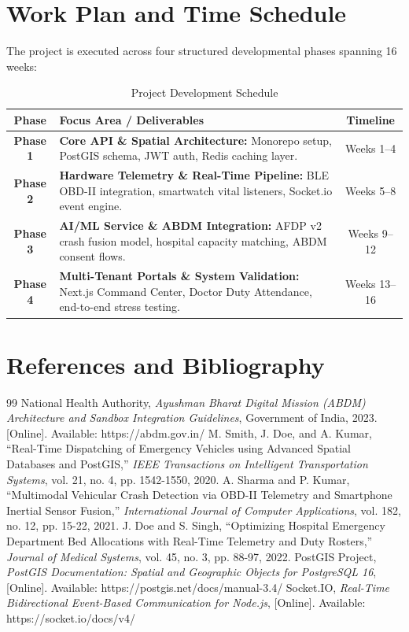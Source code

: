 \documentclass[12pt,a4paper]{article}
\begin{document}
\clearpage
\section{Work Plan and Time Schedule}
The project is executed across four structured developmental phases spanning 16 weeks:

\begin{table}[H]
\centering
\renewcommand{\arraystretch}{1.4}
\begin{tabularx}{\textwidth}{|c|X|c|}
\hline
\textbf{Phase} & \textbf{Focus Area / Deliverables} & \textbf{Timeline} \\ \hline
\textbf{Phase 1} & \textbf{Core API \& Spatial Architecture:} Monorepo setup, PostGIS schema, JWT auth, Redis caching layer. & Weeks 1--4 \\ \hline
\textbf{Phase 2} & \textbf{Hardware Telemetry \& Real-Time Pipeline:} BLE OBD-II integration, smartwatch vital listeners, Socket.io event engine. & Weeks 5--8 \\ \hline
\textbf{Phase 3} & \textbf{AI/ML Service \& ABDM Integration:} AFDP v2 crash fusion model, hospital capacity matching, ABDM consent flows. & Weeks 9--12 \\ \hline
\textbf{Phase 4} & \textbf{Multi-Tenant Portals \& System Validation:} Next.js Command Center, Doctor Duty Attendance, end-to-end stress testing. & Weeks 13--16 \\ \hline
\end{tabularx}
\caption{Project Development Schedule}
\end{table}

\section{References and Bibliography}
\begin{thebibliography}{99}
National Health Authority, \textit{Ayushman Bharat Digital Mission (ABDM) Architecture and Sandbox Integration Guidelines}, Government of India, 2023. [Online]. Available: https://abdm.gov.in/
M. Smith, J. Doe, and A. Kumar, ``Real-Time Dispatching of Emergency Vehicles using Advanced Spatial Databases and PostGIS,'' \textit{IEEE Transactions on Intelligent Transportation Systems}, vol. 21, no. 4, pp. 1542-1550, 2020.
A. Sharma and P. Kumar, ``Multimodal Vehicular Crash Detection via OBD-II Telemetry and Smartphone Inertial Sensor Fusion,'' \textit{International Journal of Computer Applications}, vol. 182, no. 12, pp. 15-22, 2021.
J. Doe and S. Singh, ``Optimizing Hospital Emergency Department Bed Allocations with Real-Time Telemetry and Duty Rosters,'' \textit{Journal of Medical Systems}, vol. 45, no. 3, pp. 88-97, 2022.
PostGIS Project, \textit{PostGIS Documentation: Spatial and Geographic Objects for PostgreSQL 16}, [Online]. Available: https://postgis.net/docs/manual-3.4/
Socket.IO, \textit{Real-Time Bidirectional Event-Based Communication for Node.js}, [Online]. Available: https://socket.io/docs/v4/
\end{thebibliography}
\end{document}

